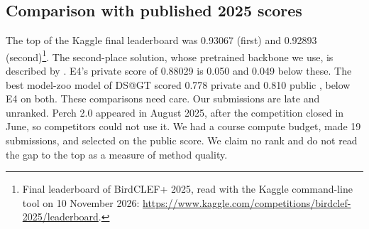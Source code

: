 \documentclass[letterpaper]{article} %
\begin{document}
\subsection{Comparison with published 2025 scores}
The top of the Kaggle final leaderboard was 0.93067 (first) and 0.92893 (second)\footnote{Final leaderboard of BirdCLEF+ 2025, read with the Kaggle command-line tool on 10 November 2026: \url{https://www.kaggle.com/competitions/birdclef-2025/leaderboard}.}. The second-place solution, whose pretrained backbone we use, is described by \citet{sydorskyi2025tackling}. E4's private score of 0.88029 is 0.050 and 0.049 below these. The best model-zoo model of DS@GT scored 0.778 private and 0.810 public \citep{miyaguchi2025distilling}, below E4 on both. These comparisons need care. Our submissions are late and unranked. Perch 2.0 appeared in August 2025, after the competition closed in June, so competitors could not use it. We had a course compute budget, made 19 submissions, and selected on the public score. We claim no rank and do not read the gap to the top as a measure of method quality.
\end{document}
